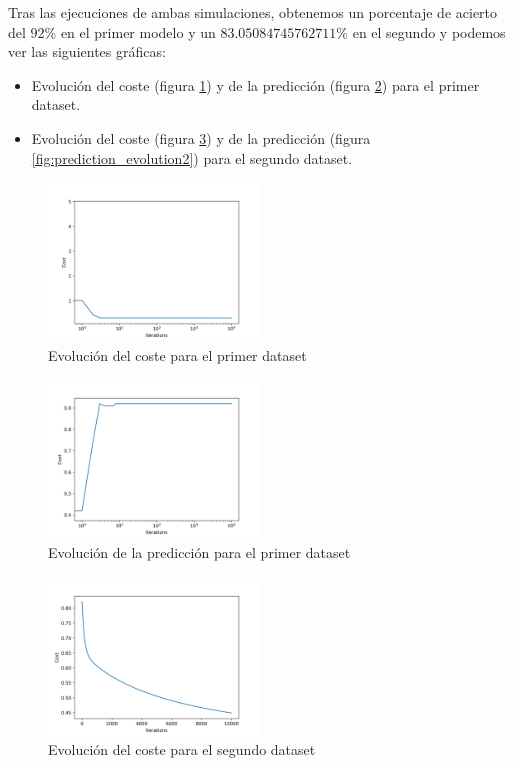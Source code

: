 \documentclass[6pt]{../../shared/AiTex}
\begin{document}
Tras las ejecuciones de ambas simulaciones, obtenemos un porcentaje de acierto del $92\%$ en el primer modelo y un $83.05084745762711\%$ en el segundo y podemos ver las siguientes gráficas:
\begin{itemize}
    \item Evolución del coste (figura \ref{fig:cost_evolution1}) y de la predicción (figura \ref{fig:prediction_evolution1}) para el primer dataset.
    \item Evolución del coste (figura \ref{fig:cost_evolution2}) y de la predicción (figura \ref{fig:prediction_evolution2}) para el segundo dataset.
\end{itemize}

\begin{figure}[H]
    \centering
    \includegraphics[width=0.5\textwidth]{./imagenes/muestreo1_cost.png}
    \caption{Evolución del coste para el primer dataset}
    \label{fig:cost_evolution1}
\end{figure}

\begin{figure}[H]
    \centering
    \includegraphics[width=0.5\textwidth]{./imagenes/muestreo1_accuracy.png}
    \caption{Evolución de la predicción para el primer dataset}
    \label{fig:prediction_evolution1}
\end{figure}

\begin{figure}[H]
    \centering
    \includegraphics[width=0.5\textwidth]{./imagenes/muestreo2_cost.png}
    \caption{Evolución del coste para el segundo dataset}
    \label{fig:cost_evolution2}
\end{figure}
\end{document}
